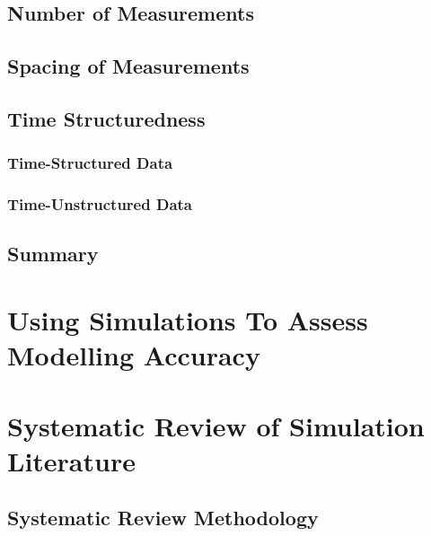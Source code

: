 \documentclass[
12pt, %
twoside,
english]{guelphthesis}
\begin{document}
\hypertarget{number-of-measurements}{%
\subsection{Number of Measurements}\label{number-of-measurements}}

\hypertarget{spacing-of-measurements}{%
\subsection{Spacing of Measurements}\label{spacing-of-measurements}}

\hypertarget{time-structuredness}{%
\subsection{Time Structuredness}\label{time-structuredness}}

\hypertarget{time-structured-data}{%
\subsubsection{Time-Structured Data}\label{time-structured-data}}

\hypertarget{time-unstructured-data}{%
\subsubsection{Time-Unstructured Data}\label{time-unstructured-data}}

\hypertarget{summary}{%
\subsection{Summary}\label{summary}}

\hypertarget{using-simulations-to-assess-modelling-accuracy}{%
\section{Using Simulations To Assess Modelling Accuracy}\label{using-simulations-to-assess-modelling-accuracy}}

\hypertarget{systematic-review-of-simulation-literature}{%
\section{Systematic Review of Simulation Literature}\label{systematic-review-of-simulation-literature}}

\hypertarget{systematic-review-methodology}{%
\subsection{Systematic Review Methodology}\label{systematic-review-methodology}}
\end{document}

